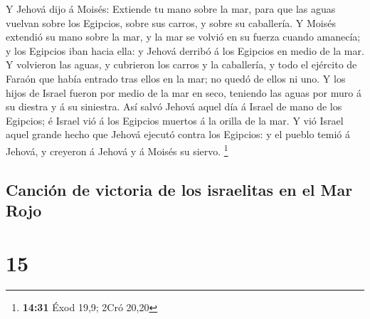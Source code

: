  Y Jehová dijo á Moisés: Extiende tu mano sobre la mar,
para que las aguas vuelvan sobre los Egipcios, sobre sus carros, y sobre
su caballería.  Y Moisés extendió su mano sobre la mar, y
la mar se volvió en su fuerza cuando amanecía; y los Egipcios iban hacia
ella: y Jehová derribó á los Egipcios en medio de la mar. 
Y volvieron las aguas, y cubrieron los carros y la caballería, y todo el
ejército de Faraón que había entrado tras ellos en la mar; no quedó de
ellos ni uno.  Y los hijos de Israel fueron por medio de la
mar en seco, teniendo las aguas por muro á su diestra y á su siniestra.
 Así salvó Jehová aquel día á Israel de mano de los
Egipcios; é Israel vió á los Egipcios muertos á la orilla de la mar.
 Y vió Israel aquel grande hecho que Jehová ejecutó contra
los Egipcios: y el pueblo temió á Jehová, y creyeron á Jehová y á Moisés
su siervo. \footnote{\textbf{14:31} Éxod 19,9; 2Cró 20,20}

\hypertarget{canciuxf3n-de-victoria-de-los-israelitas-en-el-mar-rojo}{%
\subsection{Canción de victoria de los israelitas en el Mar
Rojo}\label{canciuxf3n-de-victoria-de-los-israelitas-en-el-mar-rojo}}

\hypertarget{section-14}{%
\section{15}\label{section-14}}

